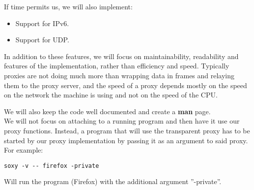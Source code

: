 \documentclass[a4paper]{article}
\begin{document}
If time permits us, we will also implement:

\begin{itemize}
\item Support for IPv6.
\item Support for UDP.
\end{itemize}

In addition to these features, we will focus on maintainability, readability
and features of the implementation, rather than efficiency and speed.
Typically proxies are not doing much more than wrapping data in frames and
relaying them to the proxy server, and the speed of a proxy depends mostly
on the speed on the network the machine is using and not on the speed of
the CPU.

We will also keep the code well documented and create a \textbf{man} page. \\

We will not focus on attaching to a running program and then have it use our
proxy functions. %
Instead, a program that will use the transparent proxy has to be started by our
proxy implementation by passing it as an argument to said proxy. For example:

\begin{verbatim}
soxy -v -- firefox -private
\end{verbatim}

Will run the program (Firefox) with the additional argument ''-private''.
\end{document}
